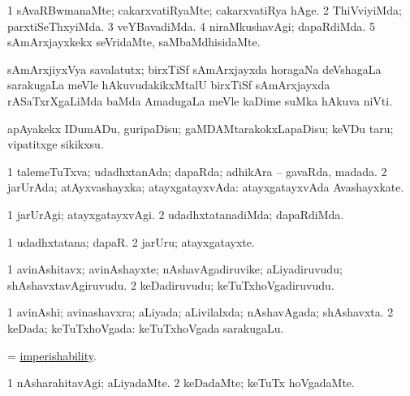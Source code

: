 \bentry
{}
\gl{\kirxvi}
\bmng
\bnum
\num{1} sAvaRBwmanaMte; cakarxvatiRyaMte; cakarxvatiRya hAge. 
\num{2} ThiVviyiMda; parxtiSeThxyiMda. 
\num{3} veYBavadiMda. 
\num{4} niraMkushavAgi; dapaRdiMda. 
\num{5} sAmArxjayxkekx seVridaMte, saMbaMdhisidaMte. 
\enum
\emng
\eentry

\bentry
{}
\gl{\nA}
\bmng
sAmArxjiyxVya savalatutx; birxTiSf sAmArxjayxda horagaNa deVshagaLa sarakugaLa meVle hAkuvudakikxMtalU birxTiSf sAmArxjayxda rASaTxrXgaLiMda baMda AmadugaLa meVle kaDime suMka hAkuva niVti. 
\emng
\eentry

\bentry
{}
\gl{\sakirx}
\bmng
 apAyakekx IDumADu, guripaDisu; gaMDAMtarakokxLapaDisu; keVDu taru; vipatitxge sikikxsu. 
\emng
\eentry

\bentry
{}
\gl{\gu}
\bmng
\bnum
\num{1} talemeTuTxva; udadhxtanAda; dapaRda; adhikAra -- gavaRda, madada. 
\num{2} jarUrAda; atAyxvashayxka; atayxgatayxvAda:  atayxgatayxvAda Avashayxkate. 
\enum
\emng
\eentry

\bentry
{}
\gl{\kirxvi}
\bmng
\bnum
\num{1} jarUrAgi; atayxgatayxvAgi. 
\num{2} udadhxtatanadiMda; dapaRdiMda. 
\enum
\emng
\eentry

\bentry
{}
\gl{\nA}
\bmng
\bnum
\num{1} udadhxtatana; dapaR. 
\num{2} jarUru; atayxgatayxte. 
\enum
\emng
\eentry

\bentry
{}
\gl{\nA}
\bmng
\bnum
\num{1} avinAshitavx; avinAshayxte; nAshavAgadiruvike; aLiyadiruvudu; shAshavxtavAgiruvudu. 
\num{2} keDadiruvudu; keTuTxhoVgadiruvudu. 
\enum
\emng
\eentry

\bentry
{}
\gl{\gu}
\bmng
\bnum
\num{1} avinAshi; avinashavxra; aLiyada; aLivilalxda; nAshavAgada; shAshavxta. 
\num{2} keDada; keTuTxhoVgada:  keTuTxhoVgada sarakugaLu. 
\enum
\emng
\eentry

\bentry
{}
\gl{\nA}
\bmng
 = \hyperlink{imperishability}{imperishability}. 
\emng
\eentry

\bentry
{}
\gl{\kirxvi}
\bmng
\bnum
\num{1} nAsharahitavAgi; aLiyadaMte. 
\num{2} keDadaMte; keTuTx hoVgadaMte. 
\enum
\emng
\eentry

